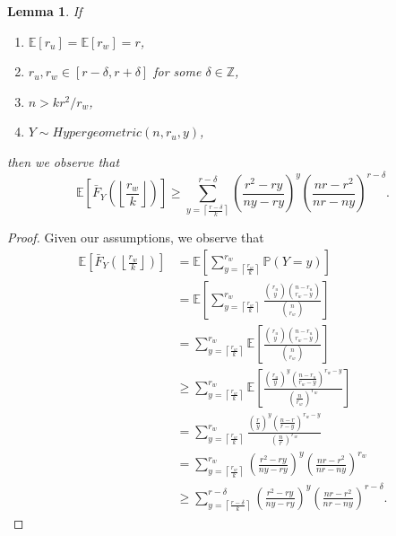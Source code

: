 \documentclass[10pt]{extarticle}
\newcommand{\Z}{\mathbb{Z}}
\newtheorem{lemma}[theorem]{Lemma}
\theoremstyle{definition}
\begin{document}
\begin{lemma}
    \label{lemma:tail-expectation}
        If \begin{enumerate}
            \item $\mathbb{E}[r_u] = \mathbb{E}[r_w] = r$,
            \item $r_u, r_w \in [r-\delta,r+\delta]$ for some $\delta \in \Z$,
            \item $n > kr^2/r_w$,
            \item $Y \sim Hypergeometric(n, r_u, y)$,
        \end{enumerate} then we observe that $$\mathbb{E} \left[ \bar{F}_Y\left(\left\lfloor \frac{r_w}{k} \right\rfloor\right) \right] \ge \sum_{y = \left\lceil \frac{r-\delta}{k} \right\rceil}^{r-\delta}
        \left(\frac{r^2 - ry}{ny-ry}\right)^{y} \left(\frac{nr-r^2}{nr-ny}\right)^{r-\delta}.$$
    \end{lemma}
    \begin{proof}
        Given our assumptions, we observe that
        \begin{equation}
        \begin{split}
            \mathbb{E} \left[\bar{F}_Y\left(\left\lfloor \frac{r_w}{k} \right\rfloor\right) \right] &=
            \mathbb{E} \left[ \sum_{y = \left\lceil \frac{r_w}{k} \right\rceil}^{r_w} \mathbb{P}(Y=y) \right] \\ &= \mathbb{E}  \left[ \sum_{y = \left\lceil \frac{r_w}{k} \right\rceil}^{r_w} \frac{\binom{r_u}{y} \binom{n-r_u}{r_w-y}}{\binom{n}{r_w}} \right] \\ &=  \sum_{y = \left\lceil \frac{r_w}{k} \right\rceil}^{r_w} \mathbb{E} \left[\frac{\binom{r_u}{y} \binom{n-r_u}{r_w-y}}{\binom{n}{r_w}}  \right] \\ &\ge \sum_{y = \left\lceil \frac{r_w}{k} \right\rceil}^{r_w} \mathbb{E} 
            \left[
                \frac
                {
                    \left(\frac{r_u}{y}\right)^{y} \left(\frac{n-r_u}{r_w - y}\right)^{r_w-y}
                }
                {
                    \left(\frac{n}{r_w}\right)^{r_w}
                }  
            \right] \\ &= 
            \sum_{y = \left\lceil \frac{r_w}{k} \right\rceil}^{r_w}
                \frac
                {
                    \left(\frac{r}{y}\right)^{y} \left(\frac{n-r}{r - y}\right)^{r_w-y}
                }
                {
                    \left(\frac{n}{r}\right)^{r_w}
                } 
                \\ &=
                \sum_{y = \left\lceil \frac{r_w}{k} \right\rceil}^{r_w}
                    \left(\frac{r^2 - ry}{ny-ry}\right)^{y} \left(\frac{nr-r^2}{nr-ny}\right)^{r_w}
                \\ &\ge
                \sum_{y = \left\lceil \frac{r-\delta}{k} \right\rceil}^{r-\delta}
                    \left(\frac{r^2 - ry}{ny-ry}\right)^{y} \left(\frac{nr-r^2}{nr-ny}\right)^{r-\delta}.
        \end{split}
    \end{equation}
    \end{proof}
\end{document}
